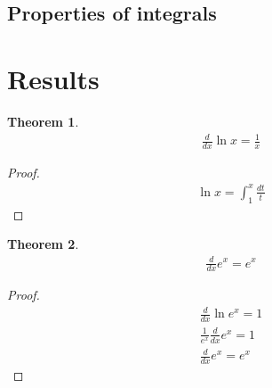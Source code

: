 \documentclass{article}
\theoremstyle{plain}
\newtheorem{theorem}{Theorem}
\theoremstyle{definition}
\begin{document}
\subsection{Properties of integrals}

\section{Results}

\begin{theorem}
\begin{align}
    \frac{d}{dx} \ln x= \frac{1}{x}
\end{align}
\end{theorem}
\begin{proof}
\begin{align}
    \ln x = \int_1^x \frac{dt}{t}
    
\end{align}
\end{proof}


\begin{theorem}
\begin{align}
    \frac{d}{dx} e^x =e^x
\end{align}
\end{theorem}
\begin{proof}
\begin{align}
    \frac{d}{dx} \ln e^x = 1 \\ \nonumber
    \frac{1}{e^x} \frac{d}{dx} e^x = 1 \\ \nonumber
    \frac{d}{dx} e^x =e^x 
\end{align}
\end{proof}
\end{document}
